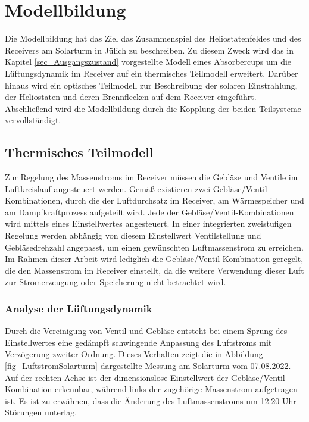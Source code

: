 \chapter{Modellbildung} \label{ch_Modellbildung}
Die Modellbildung hat das Ziel das Zusammenspiel des Heliostatenfeldes und des Receivers am Solarturm in Jülich zu beschreiben.
Zu diesem Zweck wird das in Kapitel \ref{sec_Ausgangszustand} vorgestellte Modell eines Absorbercups um die Lüftungsdynamik im Receiver auf ein thermisches Teilmodell erweitert.
Darüber hinaus wird ein optisches Teilmodell zur Beschreibung der solaren Einstrahlung, der Heliostaten und deren Brennflecken auf dem Receiver eingeführt.
Abschließend wird die Modellbildung durch die Kopplung der beiden Teilsysteme vervollständigt.

\section{Thermisches Teilmodell} \label{sec_thermischesModell}
Zur Regelung des Massenstroms im Receiver müssen die Gebläse und Ventile im Luftkreislauf angesteuert werden.
Gemäß \cite[S.10ff]{DissGall} existieren zwei Gebläse/Ventil-Kombinationen, durch die der Luftdurchsatz im Receiver, am Wärmespeicher und am Dampfkraftprozess aufgeteilt wird.
Jede der Gebläse/Ventil-Kombinationen wird mittels eines Einstellwertes angesteuert.
In einer integrierten zweistufigen Regelung werden abhängig von diesem Einstellwert Ventilstellung und Gebläsedrehzahl angepasst, um einen gewünschten Luftmassenstrom zu erreichen.
Im Rahmen dieser Arbeit wird lediglich die Gebläse/Ventil-Kombination geregelt, die den Massenstrom im Receiver einstellt, da die weitere Verwendung dieser Luft zur Stromerzeugung oder Speicherung nicht betrachtet wird.

\subsection{Analyse der Lüftungsdynamik} \label{subsec_AnalyseLüftungsDyn}
Durch die Vereinigung von Ventil und Gebläse entsteht bei einem Sprung des Einstellwertes eine gedämpft schwingende Anpassung des Luftstroms mit Verzögerung zweiter Ordnung.
Dieses Verhalten zeigt die in Abbildung \ref{fig_LuftstromSolarturm} dargestellte Messung am Solarturm vom 07.08.2022.
Auf der rechten Achse ist der dimensionslose Einstellwert der Gebläse/Ventil-Kombination erkennbar, während links der zugehörige Massenstrom aufgetragen ist.
Es ist zu erwähnen, dass die Änderung des Luftmassenstroms um 12:20 Uhr Störungen unterlag. \newpage

